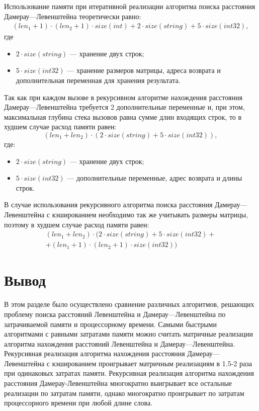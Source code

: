 Использование памяти при итеративной реализации алгоритма поиска расстояния Дамерау---Левенштейна теоретически равно:
\begin{equation}
	\begin{aligned}
		(len_{1} + 1) \cdot (len_{2} + 1) \cdot size(int) + 2 \cdot size(string) + 5 \cdot size(int32),
	\end{aligned}
\end{equation}
где 
\begin{itemize}
	\item $2 \cdot size(string)$ --- хранение двух строк;
	\item $5 \cdot size(int32)$ --- хранение размеров матрицы, адреса возврата и дополнительная переменная для хранения результата.
\end{itemize}

Так как при каждом вызове в рекурсивном алгоритме нахождения расстояния Дамерау---Левенштейна требуется 2 дополнительные переменные и, при этом, максимальная глубина стека вызовов равна сумме длин входящих строк, то в худшем случае расход памяти равен:
\begin{equation}
	(len_{1} + len_{2}) \cdot (2 \cdot size(string) + 5 \cdot size(int32)),
\end{equation}
где:
\begin{itemize}
	\item $2 \cdot size(string)$ --- хранение двух строк;
	\item $5 \cdot size(int32)$ --- дополнительные переменные, адрес возврата и длины строк.
\end{itemize}

В случае использования рекурсивного алгоритма поиска расстояния Дамерау---Левенштейна с кэшированием необходимо так же учитывать размеры матрицы, поэтому в худшем случае расход памяти равен:
\begin{equation}
	\begin{aligned}
		(len_{1} + len_{2}) \cdot (2 \cdot size(string) + 5 \cdot size(int32) + \\ + (len_{1} + 1) \cdot (len_{2} + 1) \cdot size(int32))
	\end{aligned}
\end{equation}

\section*{Вывод} 

В этом разделе было осуществлено сравнение различных алгоритмов, решающих проблему поиска расстояний Левенштейна и Дамерау---Левенштейна по затрачиваемой памяти и процессорному времени. 
Самыми быстрыми алгоритмами с равными затратами памяти можно считать матричные реализации алгоритма нахождения расстояний Левенштейна и Дамерау---Левенштейна.
Рекурсивная реализация алгоритма нахождения расстояния Дамерау---Левенштейна с кэшированием проигрывает матричным реализациям в 1.5-2 раза при одинаковых затратах памяти. 
Рекурсивная реализация алгоритма нахождения расстояния Дамерау-Левенштейна многократно выигрывает все остальные реализации по затратам памяти, однако многократно проигрывает по затратам процессорного времени при любой длине слова.